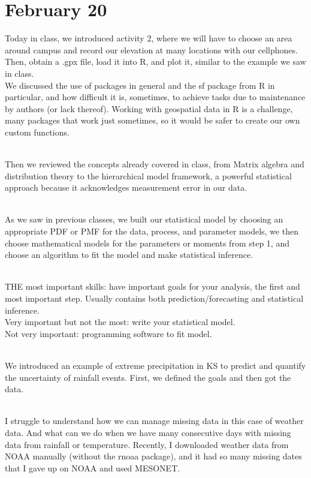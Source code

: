 \documentclass[
]{book}
\begin{document}
\hypertarget{february-20}{%
\section{February 20}\label{february-20}}

Today in class, we introduced activity 2, where we will have to choose an area around campus and record our elevation at many locations with our cellphones. Then, obtain a .gpx file, load it into R, and plot it, similar to the example we saw in class.\\
We discussed the use of packages in general and the sf package from R in particular, and how difficult it is, sometimes, to achieve tasks due to maintenance by authors (or lack thereof). Working with geospatial data in R is a challenge, many packages that work just sometimes, so it would be safer to create our own custom functions.\\
\strut \\
Then we reviewed the concepts already covered in class, from Matrix algebra and distribution theory to the hierarchical model framework, a powerful statistical approach because it acknowledges measurement error in our data.\\
\strut \\
As we saw in previous classes, we built our statistical model by choosing an appropriate PDF or PMF for the data, process, and parameter models, we then choose mathematical models for the parameters or moments from step 1, and choose an algorithm to fit the model and make statistical inference.\\
\strut \\
THE most important skills: have important goals for your analysis, the first and most important step. Usually contains both prediction/forecasting and statistical inference.\\
Very important but not the most: write your statistical model.\\
Not very important: programming software to fit model.\\
\strut \\
We introduced an example of extreme precipitation in KS to predict and quantify the uncertainty of rainfall events. First, we defined the goals and then got the data.\\
\strut \\
I struggle to understand how we can manage missing data in this case of weather data. And what can we do when we have many consecutive days with missing data from rainfall or temperature. Recently, I downloaded weather data from NOAA manually (without the rnoaa package), and it had so many missing dates that I gave up on NOAA and used MESONET.
\end{document}
